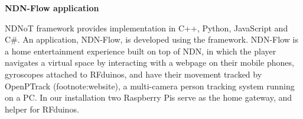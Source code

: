 \documentclass{sig-alternate-05-2015}
\begin{document}
\textbf{NDN-Flow application}

NDNoT framework provides implementation in C++, Python, JavaScript and C\#. An application, NDN-Flow, is developed using the framework. NDN-Flow is a home entertainment experience built on top of NDN, in which the player navigates a virtual space by interacting with a webpage on their mobile phones, gyroscopes attached to RFduinos, and have their movement tracked by OpenPTrack (footnote:website), a multi-camera person tracking system running on a PC. In our installation two Raspberry Pis serve as the home gateway, and helper for RFduinos.

\end{document}
